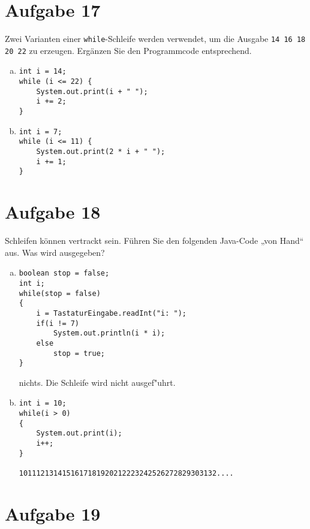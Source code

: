 \documentclass[10pt, oneside]{article}
\begin{document}
\pagebreak
\section{Aufgabe 17}

Zwei Varianten einer \verb|while|-Schleife werden verwendet, um die Ausgabe
\verb|14 16 18 20 22| zu erzeugen. Ergänzen Sie den Programmcode entsprechend.

\begin{enumerate}[(a)]
\item
\begin{verbatim}
int i = 14;
while (i <= 22) {
    System.out.print(i + " ");
    i += 2;
}
\end{verbatim}

\item
\begin{verbatim}
int i = 7;
while (i <= 11) {
    System.out.print(2 * i + " ");
    i += 1;
}
\end{verbatim}
\end{enumerate}

\section{Aufgabe 18}

Schleifen können vertrackt sein. Führen Sie den folgenden Java-Code „von Hand“ aus.
Was wird ausgegeben?

\begin{enumerate}[(a)]
\item
\begin{verbatim}
boolean stop = false;
int i;
while(stop = false)
{
    i = TastaturEingabe.readInt("i: ");
    if(i != 7)
        System.out.println(i * i);
    else
        stop = true;
}
\end{verbatim}

nichts. Die Schleife wird nicht ausgef"uhrt.

\item
\begin{verbatim}
int i = 10;
while(i > 0)
{
    System.out.print(i);
    i++;
}

1011121314151617181920212223242526272829303132....
\end{verbatim}

\end{enumerate}

\pagebreak
\section{Aufgabe 19}
\end{document}
